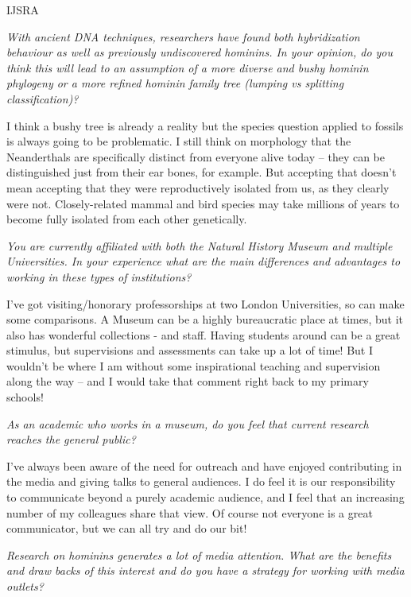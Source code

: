 \begin{labeling}{IJSRA}
\item[IJSRA]
\emph{With ancient DNA techniques, researchers have found both hybridization behaviour as well as
previously undiscovered hominins.
In your opinion, do you think this will lead to an assumption of a more diverse and bushy hominin phylogeny or
a more refined hominin family tree (lumping vs splitting classification)?}

\item[CS]
I think a bushy tree is already a reality but the species question applied to fossils is always going to be problematic.
I still think on morphology that the Neanderthals are specifically distinct from everyone alive today – they can be
distinguished just from their ear bones, for example.
But accepting that doesn’t mean accepting that they were reproductively isolated from us, as they clearly were not.
Closely-related mammal and bird species may take millions of years to become fully isolated from each other genetically.

\item[IJSRA]
\emph{You are currently affiliated with both the Natural History Museum and multiple Universities.
In your experience what are the main differences and advantages to working in these types of institutions?}

\item[CS]
I’ve got visiting/honorary professorships at two London Universities, so can make some comparisons.
A Museum can be a highly bureaucratic place at times, but it also has wonderful collections - and staff.
Having students around can be a great stimulus, but supervisions and assessments can take up a lot of time!
But I wouldn’t be where I am without some inspirational teaching and supervision along the way – and
I would take that comment right back to my primary schools!

\item[IJSRA]
\emph{As an academic who works in a museum, do you feel that current research reaches the general public?}

\item[CS]
I’ve always been aware of the need for outreach and have enjoyed contributing in the media and
giving talks to general audiences.
I do feel it is our responsibility to communicate beyond a purely academic audience, and I feel that an increasing number of
my colleagues share that view. 
Of course not everyone is a great communicator, but we can all try and do our bit!

\item[IJSRA]
\emph{Research on hominins generates a lot of media attention.
What are the benefits and draw backs of this interest and do you have a strategy for working with media outlets?}


\end{labeling}
